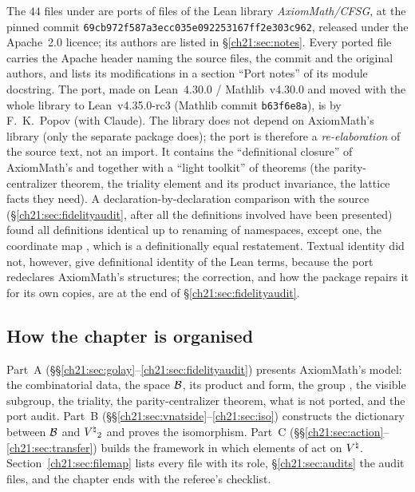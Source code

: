 The $44$ files under  are ports of files
of the Lean library \emph{AxiomMath/CFSG}, at the pinned commit
\texttt{69cb972f587a3ecc035e092253167ff2e303c962}, released under the Apache~2.0 licence; its authors
are listed in \S\ref{ch21:sec:notes}.  Every ported file carries the Apache header naming the source
files, the commit and the original authors, and lists its modifications in a section ``Port notes'' of
its module docstring.  The port, made on Lean~4.30.0 / Mathlib~v4.30.0 and moved with the whole library to
Lean~v4.35.0-rc3 (Mathlib commit \texttt{b63f6e8a}), is by F.~K.~Popov (with Claude).  The library does not depend on
AxiomMath's library (only the separate package  does); the port is therefore a
\emph{re-elaboration} of the source text, not an import.  It contains the ``definitional closure'' of
AxiomMath's  and  together with a ``light toolkit'' of theorems (the
parity-centralizer theorem, the triality element and its product invariance, the lattice facts they
need).  A declaration-by-declaration comparison with the source (\S\ref{ch21:sec:fidelityaudit}, after
all the definitions involved have been presented) found all definitions identical up to renaming of
namespaces, except one, the coordinate map , which is a definitionally equal restatement.  Textual identity did
not, however, give definitional identity of the Lean terms, because the port redeclares AxiomMath's structures; the correction,
and how the package  repairs it for its own copies, are at the end of
\S\ref{ch21:sec:fidelityaudit}.

\subsection{How the chapter is organised}

Part~A (\S\S\ref{ch21:sec:golay}--\ref{ch21:sec:fidelityaudit}) presents AxiomMath's model: the
combinatorial data, the space $\mathcal{B}$, its product and form, the group , the visible
subgroup, the triality, the parity-centralizer theorem, what is not ported, and the port audit.  Part~B
(\S\S\ref{ch21:sec:vnatside}--\ref{ch21:sec:iso}) constructs the dictionary between $\mathcal{B}$ and
${V^{\natural}}_2$ and proves the isomorphism.  Part~C (\S\S\ref{ch21:sec:action}--\ref{ch21:sec:transfer})
builds the framework in which elements of  act on ${V^{\natural}}$.  Section~\ref{ch21:sec:filemap}
lists every file with its role, \S\ref{ch21:sec:audits} the audit files, and the chapter ends
with the referee's checklist.

